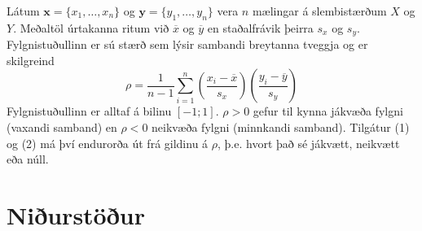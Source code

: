 \documentclass[12pt]{article}
\begin{document}
Látum $\mathbf x = \{x_1, \ldots, x_n\}$ og $\mathbf y = \{y_1, \ldots, y_n\}$ vera $n$ mælingar á slembistærðum $X$ og $Y$. Meðaltöl úrtakanna 
ritum við $\overline x$ og $\overline y$ en staðalfrávik þeirra $s_x$ og $s_y$. Fylgnistuðullinn er sú stærð sem lýsir sambandi breytanna tveggja
og er skilgreind
\[
    \rho = \frac{1}{n - 1} \sum_{i = 1}^n \left(\frac{x_i - \overline x}{s_x}\right)\left(\frac{y_i - \overline y}{s_y}\right)
\]
Fylgnistuðullinn er alltaf á bilinu $[-1;1]$. $\rho > 0$ gefur til kynna jákvæða fylgni (vaxandi samband) en $\rho < 0$ neikvæða fylgni (minnkandi samband). Tilgátur (1) og (2) má því endurorða út frá gildinu á $\rho$, þ.e. hvort það sé jákvætt, neikvætt eða núll.

\section{Niðurstöður}
\end{document}
